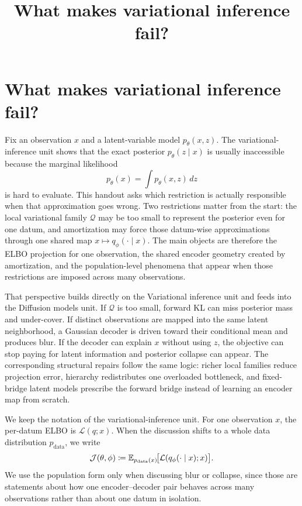 \documentclass[11pt]{article}
\title{What makes variational inference fail?}
\author{}
\date{}
\begin{document}
\maketitle

\section[VI failure modes and geometry]{What makes variational inference fail?}
\label{sec:vi-failures-handout}

Fix an observation \(x\) and a latent-variable model \(p_\theta(x,z)\).
The variational-inference unit shows that the exact posterior \(p_\theta(z\mid x)\) is usually inaccessible because the marginal likelihood
\[
  p_\theta(x)=\int p_\theta(x,z)\,dz
\]
is hard to evaluate.
This handout asks which restriction is actually responsible when that approximation goes wrong.
Two restrictions matter from the start: the local variational family \(\mathcal{Q}\) may be too small to represent the posterior even for one datum, and amortization may force those datum-wise approximations through one shared map \(x\mapsto q_\phi(\cdot\mid x)\).
The main objects are therefore the ELBO projection for one observation, the shared encoder geometry created by amortization, and the population-level phenomena that appear when those restrictions are imposed across many observations.

That perspective builds directly on the Variational inference unit and feeds into the Diffusion models unit.
If \(\mathcal{Q}\) is too small, forward KL can miss posterior mass and under-cover.
If distinct observations are mapped into the same latent neighborhood, a Gaussian decoder is driven toward their conditional mean and produces blur.
If the decoder can explain \(x\) without using \(z\), the objective can stop paying for latent information and posterior collapse can appear.
The corresponding structural repairs follow the same logic: richer local families reduce projection error, hierarchy redistributes one overloaded bottleneck, and fixed-bridge latent models prescribe the forward bridge instead of learning an encoder map from scratch.

We keep the notation of the variational-inference unit.
For one observation \(x\), the per-datum ELBO is \(\mathcal{L}(q;x)\).
When the discussion shifts to a whole data distribution \(p_{\mathrm{data}}\), we write
\[
  \mathcal{J}(\theta,\phi)
  \coloneqq
  \mathbb{E}_{p_{\mathrm{data}}(x)}\!\bigl[\mathcal{L}(q_\phi(\cdot\mid x);x)\bigr].
\]
We use the population form only when discussing blur or collapse, since those are statements about how one encoder--decoder pair behaves across many observations rather than about one datum in isolation.
\end{document}
